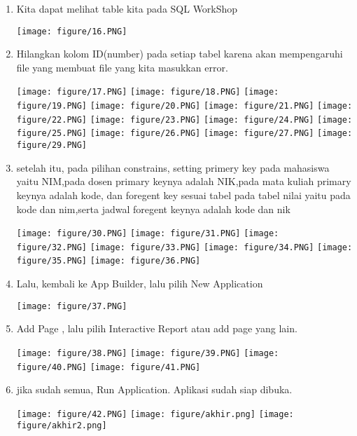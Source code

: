 \documentclass{article}
\begin{document}
\begin{enumerate}
   \newpage \item Kita dapat melihat table kita pada SQL WorkShop
     \begin{center}
    \texttt{[image: figure/16.PNG]}
    \end{center}
    \item Hilangkan kolom ID(number) pada setiap tabel karena akan mempengaruhi file yang membuat file yang kita masukkan error.
     \begin{center}
    \texttt{[image: figure/17.PNG]}
    \texttt{[image: figure/18.PNG]}
    \texttt{[image: figure/19.PNG]}
    \texttt{[image: figure/20.PNG]}
    \texttt{[image: figure/21.PNG]}
    \texttt{[image: figure/22.PNG]}
    \texttt{[image: figure/23.PNG]}
    \texttt{[image: figure/24.PNG]}
    \texttt{[image: figure/25.PNG]}
    \texttt{[image: figure/26.PNG]}
    \texttt{[image: figure/27.PNG]}
    \texttt{[image: figure/29.PNG]}
    \end{center}
    \item setelah itu, pada pilihan constrains, setting primery key pada mahasiswa yaitu NIM,pada dosen primary keynya adalah NIK,pada mata kuliah primary keynya adalah kode, dan foregent key sesuai tabel pada tabel nilai yaitu pada kode dan nim,serta jadwal foregent keynya adalah kode dan nik
    \begin{center}
    \texttt{[image: figure/30.PNG]}
    \texttt{[image: figure/31.PNG]}
    \texttt{[image: figure/32.PNG]}
    \texttt{[image: figure/33.PNG]}
    \texttt{[image: figure/34.PNG]}
    \texttt{[image: figure/35.PNG]}
    \texttt{[image: figure/36.PNG]}
    \end{center}
    \item Lalu, kembali ke App Builder, lalu pilih New Application
     \begin{center}
    \texttt{[image: figure/37.PNG]}
    \end{center}
    \item Add Page , lalu pilih Interactive Report atau add page yang lain.
     \begin{center}
    \texttt{[image: figure/38.PNG]}
     \texttt{[image: figure/39.PNG]}
      \texttt{[image: figure/40.PNG]}
       \texttt{[image: figure/41.PNG]}
    \end{center}
    \item jika sudah semua, Run Application. Aplikasi sudah siap dibuka.
     \begin{center}
    \texttt{[image: figure/42.PNG]}
    \texttt{[image: figure/akhir.png]}
    \texttt{[image: figure/akhir2.png]}
    \end{center}
\end{enumerate}
\end{document}
